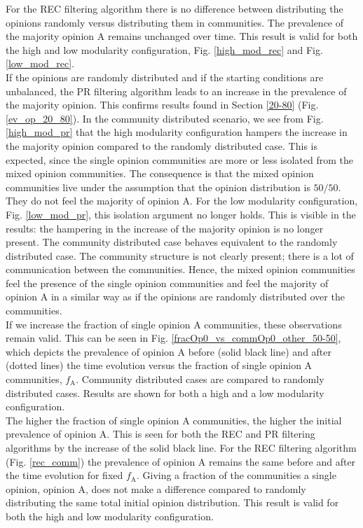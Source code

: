 \documentclass[11 pt , letterpaper , twoside , openright]{book}
\begin{document}
\newline
For the REC filtering algorithm there is no difference between distributing the opinions randomly versus distributing them in communities. The prevalence of the majority opinion A remains unchanged over time. This result is valid for both the high and low modularity configuration, Fig. \ref{high_mod_rec} and Fig. \ref{low_mod_rec}.\\
\newline
If the opinions are randomly distributed and if the starting conditions are unbalanced, the PR filtering algorithm leads to an increase in the prevalence of the majority opinion. This confirms results found in Section \ref{20-80} (Fig. \ref{ev_op_20_80}). In the community distributed scenario, we see from Fig. \ref{high_mod_pr} that the high modularity configuration hampers the increase in the majority opinion compared to the randomly distributed case. This is expected, since the single opinion communities are more or less isolated from the mixed opinion communities. The consequence is that the mixed opinion communities live under the assumption that the opinion distribution is $50/50$. They do not feel the majority of opinion A. For the low modularity configuration, Fig. \ref{low_mod_pr}, this isolation argument no longer holds. This is visible in the results: the hampering in the increase of the majority opinion is no longer present. The community distributed case behaves equivalent to the randomly distributed case. The community structure is not clearly present; there is a lot of communication between the communities. Hence, the mixed opinion communities feel the presence of the single opinion communities and feel the majority of opinion A in a similar way as if the opinions are randomly distributed over the communities.\\
\newline
If we increase the fraction of single opinion A communities, these observations remain valid. This can be seen in Fig. \ref{fracOp0_vs_commOp0_other_50-50}, which depicts the prevalence of opinion A before (solid black line) and after (dotted lines) the time evolution versus the fraction of single opinion A communities, $f_\text{A}$. Community distributed cases are compared to randomly distributed cases. Results are shown for both a high and a low modularity configuration.\\
\newline
The higher the fraction of single opinion A communities, the higher the initial prevalence of opinion A. This is seen for both the REC and PR filtering algorithms by the increase of the solid black line. For the REC filtering algorithm (Fig. \ref{rec_comm}) the prevalence of opinion A remains the same before and after the time evolution for fixed $f_\text{A}$. Giving a fraction of the communities a single opinion, opinion A, does not make a difference compared to randomly distributing the same total initial opinion distribution. This result is valid for both the high and low modularity configuration.\\
\end{document}
